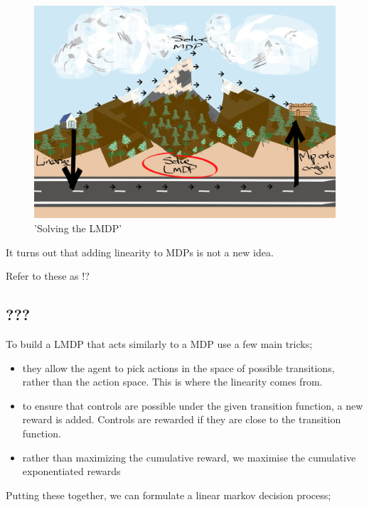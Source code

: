 \begin{figure}
  \centering
  \includegraphics[width=1\textwidth,height=0.5\textheight]{../../pictures/drawings/abstract-representations-solve.png}
  \caption{'Solving the LMDP'}
\end{figure}

It turns out that adding linearity to MDPs is not a new idea.

Refer to these as !?

\subsection{???}

To build a LMDP that acts similarly to a MDP \cite{Todorov2006} use a few main tricks;

\begin{itemize}
\tightlist
  \item
  they allow the agent to pick actions in the space of possible transitions, rather than the action space.
  This is where the linearity comes from.
  \item
  to ensure that controls are possible under the given transition function, a new reward is added.
  Controls are rewarded if they are close to the transition function.
  \item
  rather than maximizing the cumulative reward, we maximise the cumulative exponentiated rewards
\end{itemize}

Putting these together, we can formulate a linear markov decision process;

